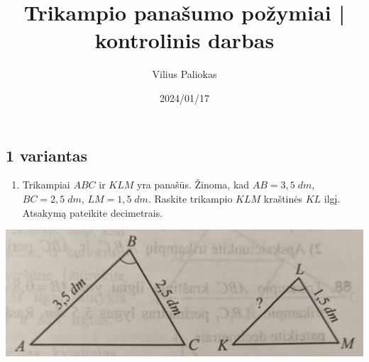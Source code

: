 \documentclass[a4paper]{article}
\title{Trikampio panašumo požymiai | kontrolinis darbas }
\author{Vilius Paliokas}
\date{2024/01/17}
\begin{document}
\thispagestyle{fancy}

\subsection*{1 variantas}

\begin{minipage}{0.5\textwidth}
      \begin{enumerate}
            \setcounter{enumi}{0} %
            \item Trikampiai $ABC$ ir $KLM$ yra panašūs. Žinoma, kad $AB=3,5 \; dm$, $BC=2,5 \;
                        dm$, $LM=1,5 \; dm$. Raskite trikampio $KLM$ kraštinės $KL$ ilgį. Atsakymą
                  pateikite decimetrais.
      \end{enumerate}

      \begin{center}
            \includegraphics[scale=0.45]{images/triangle_1.png}
      \end{center}

\end{minipage}
\end{document}
